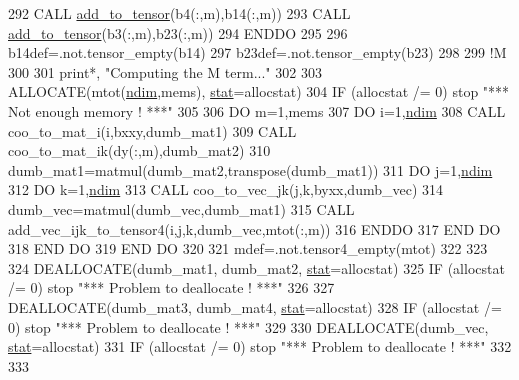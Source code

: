 \begin{DoxyCode}
292        \textcolor{keyword}{CALL }\hyperlink{namespacetensor_aad7cd55f3a4cec4676cc7ca34b05f1a8}{add\_to\_tensor}(b4(:,m),b14(:,m))
293        \textcolor{keyword}{CALL }\hyperlink{namespacetensor_aad7cd55f3a4cec4676cc7ca34b05f1a8}{add\_to\_tensor}(b3(:,m),b23(:,m))
294 \textcolor{keywordflow}{    ENDDO}
295 
296     b14def=.not.tensor\_empty(b14)
297     b23def=.not.tensor\_empty(b23)
298 
299     \textcolor{comment}{!M}
300 
301     print*, \textcolor{stringliteral}{"Computing the M term..."}
302 
303     \textcolor{keyword}{ALLOCATE}(mtot(\hyperlink{namespaceparams_a2323fe1773f086e20c14f266351c482b}{ndim},mems), \hyperlink{namespacestat}{stat}=allocstat)
304     \textcolor{keywordflow}{IF} (allocstat /= 0) stop \textcolor{stringliteral}{"*** Not enough memory ! ***"}
305 
306     \textcolor{keywordflow}{DO} m=1,mems
307        \textcolor{keywordflow}{DO} i=1,\hyperlink{namespaceparams_a2323fe1773f086e20c14f266351c482b}{ndim}
308           \textcolor{keyword}{CALL }coo\_to\_mat\_i(i,bxxy,dumb\_mat1)
309           \textcolor{keyword}{CALL }coo\_to\_mat\_ik(dy(:,m),dumb\_mat2)
310           dumb\_mat1=matmul(dumb\_mat2,transpose(dumb\_mat1))
311           \textcolor{keywordflow}{DO} j=1,\hyperlink{namespaceparams_a2323fe1773f086e20c14f266351c482b}{ndim}
312              \textcolor{keywordflow}{DO} k=1,\hyperlink{namespaceparams_a2323fe1773f086e20c14f266351c482b}{ndim}
313                 \textcolor{keyword}{CALL }coo\_to\_vec\_jk(j,k,byxx,dumb\_vec)
314                 dumb\_vec=matmul(dumb\_vec,dumb\_mat1)
315                 \textcolor{keyword}{CALL }add\_vec\_ijk\_to\_tensor4(i,j,k,dumb\_vec,mtot(:,m))
316 \textcolor{keywordflow}{             ENDDO}
317 \textcolor{keywordflow}{          END DO}
318 \textcolor{keywordflow}{       END DO}
319 \textcolor{keywordflow}{    END DO}
320 
321     mdef=.not.tensor4\_empty(mtot)
322     
323 
324     \textcolor{keyword}{DEALLOCATE}(dumb\_mat1, dumb\_mat2, \hyperlink{namespacestat}{stat}=allocstat)
325     \textcolor{keywordflow}{IF} (allocstat /= 0)  stop \textcolor{stringliteral}{"*** Problem to deallocate ! ***"}
326 
327     \textcolor{keyword}{DEALLOCATE}(dumb\_mat3, dumb\_mat4, \hyperlink{namespacestat}{stat}=allocstat)
328     \textcolor{keywordflow}{IF} (allocstat /= 0)  stop \textcolor{stringliteral}{"*** Problem to deallocate ! ***"}
329 
330     \textcolor{keyword}{DEALLOCATE}(dumb\_vec, \hyperlink{namespacestat}{stat}=allocstat)
331     \textcolor{keywordflow}{IF} (allocstat /= 0)  stop \textcolor{stringliteral}{"*** Problem to deallocate ! ***"}
332 
333     
\end{DoxyCode}


